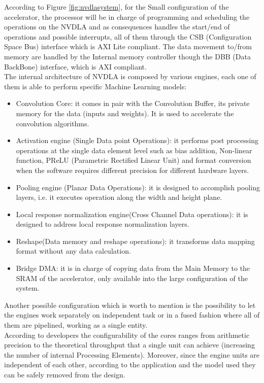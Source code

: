According to Figure \ref{fig:nvdlasystem}, for the Small configuration of the accelerator, the processor will be in charge of programming and scheduling the operations on the NVDLA and as consequences handles the start/end of operations and possible interrupts, all of them through the CSB (Configuration Space Bus) interface which is AXI Lite compliant\cite{paper:30}. \newline
The data movement to/from memory are handled by the Internal memory controller though the DBB (Data BackBone) interface, which is AXI \cite{paper:30} compliant.\\

The internal architecture of NVDLA is composed by various engines, each one of them is able to perform specific Machine Learning models:
\begin{itemize}
\item Convolution Core: it comes in pair with the Convolution Buffer, its private memory for the data (inputs and weights). It is used to accelerate the convolution algorithms.
\item Activation engine (Single Data point Operations): it performs post processing operations at the single data element level such as bias addition, Non-linear function, PReLU (Parametric Rectified Linear Unit) and format conversion when the software requires different precision for different hardware layers.
\item Pooling engine (Planar Data Operations): it is designed to accomplish pooling layers, i.e. it executes operation along the width and height plane.
\item Local response normalization engine(Cross Channel Data operations): it is designed to address local response normalization layers.
\item Reshape(Data memory and reshape operations): it transforms data mapping format without any data calculation.
\item Bridge DMA: it is in charge of copying data from the Main Memory to the SRAM of the accelerator, only available into the large configuration of the system.
\end{itemize}

Another possible configuration which is worth to mention is the possibility to let the engines work separately on independent task or in a fused fashion where all of them are pipelined, working as a single entity.\\

According to developers the configurability of the cores ranges from arithmetic precision to the theoretical throughput that a single unit can achieve (increasing the number of internal Processing Elements). Moreover, since the engine units are independent of each other, according to the application and the model used they can be safely removed from the design.
\newpage
